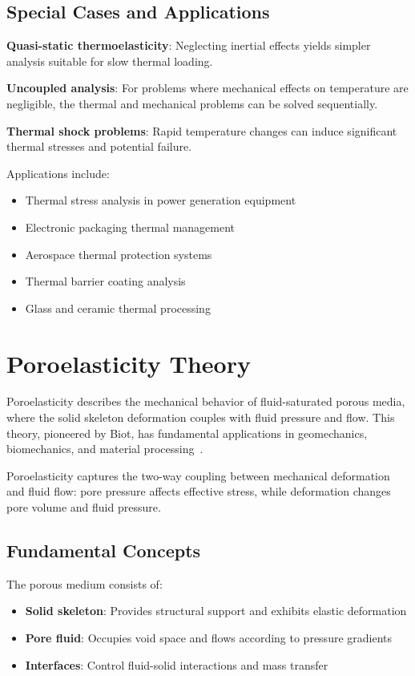 \subsection{Special Cases and Applications}

\textbf{Quasi-static thermoelasticity}: Neglecting inertial effects yields simpler analysis suitable for slow thermal loading.

\textbf{Uncoupled analysis}: For problems where mechanical effects on temperature are negligible, the thermal and mechanical problems can be solved sequentially.

\textbf{Thermal shock problems}: Rapid temperature changes can induce significant thermal stresses and potential failure.

Applications include:
\begin{itemize}
\item Thermal stress analysis in power generation equipment
\item Electronic packaging thermal management
\item Aerospace thermal protection systems
\item Thermal barrier coating analysis
\item Glass and ceramic thermal processing
\end{itemize}

\section{Poroelasticity Theory}

Poroelasticity describes the mechanical behavior of fluid-saturated porous media, where the solid skeleton deformation couples with fluid pressure and flow. This theory, pioneered by Biot, has fundamental applications in geomechanics, biomechanics, and material processing~\autocite{Sadd.2019}.

\begin{keypoint}
Poroelasticity captures the two-way coupling between mechanical deformation and fluid flow: pore pressure affects effective stress, while deformation changes pore volume and fluid pressure.
\end{keypoint}

\subsection{Fundamental Concepts}

The porous medium consists of:
\begin{itemize}
\item \textbf{Solid skeleton}: Provides structural support and exhibits elastic deformation
\item \textbf{Pore fluid}: Occupies void space and flows according to pressure gradients
\item \textbf{Interfaces}: Control fluid-solid interactions and mass transfer
\end{itemize}

